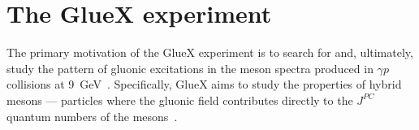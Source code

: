 

\section{The GlueX experiment \label{sec:gluexexperiment} }

The primary motivation of the GlueX experiment is to search for and, ultimately, study the pattern of gluonic excitations in the meson spectra produced 
in $\gamma p$ collisions at 9~GeV~\cite{gluex-ref}. Specifically, GlueX aims to study the properties of hybrid mesons --- particles where the gluonic field 
contributes directly to the $J^{PC}$ quantum numbers of the mesons~\cite{meyer:2015eta}. 

